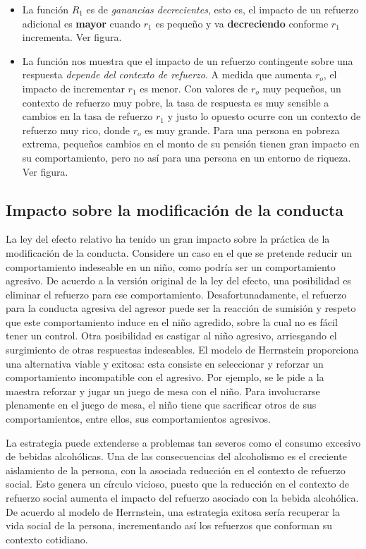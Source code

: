 \documentclass[
  letterpaper,
]{book}
\begin{document}
\begin{itemize}
\item
  La función \(R_1\) es de \emph{ganancias decrecientes}, esto es, el
  impacto de un refuerzo adicional es \textbf{mayor} cuando \(r_1\) es
  pequeño y va \textbf{decreciendo} conforme \(r_1\) incrementa. Ver
  figura.
\item
  La función nos muestra que el impacto de un refuerzo contingente sobre
  una respuesta \emph{depende del contexto de refuerzo}. A medida que
  aumenta \(r_o\), el impacto de incrementar \(r_1\) es menor. Con
  valores de \(r_o\) muy pequeños, un contexto de refuerzo muy pobre, la
  tasa de respuesta es muy sensible a cambios en la tasa de refuerzo
  \(r_1\) y justo lo opuesto ocurre con un contexto de refuerzo muy
  rico, donde \(r_o\) es muy grande. Para una persona en pobreza
  extrema, pequeños cambios en el monto de su pensión tienen gran
  impacto en su comportamiento, pero no así para una persona en un
  entorno de riqueza. Ver figura.
\end{itemize}

\subsection{Impacto sobre la modificación de la
conducta}\label{impacto-sobre-la-modificaciuxf3n-de-la-conducta}

La ley del efecto relativo ha tenido un gran impacto sobre la práctica
de la modificación de la conducta. Considere un caso en el que se
pretende reducir un comportamiento indeseable en un niño, como podría
ser un comportamiento agresivo. De acuerdo a la versión original de la
ley del efecto, una posibilidad es eliminar el refuerzo para ese
comportamiento. Desafortunadamente, el refuerzo para la conducta
agresiva del agresor puede ser la reacción de sumisión y respeto que
este comportamiento induce en el niño agredido, sobre la cual no es
fácil tener un control. Otra posibilidad es castigar al niño agresivo,
arriesgando el surgimiento de otras respuestas indeseables. El modelo de
Herrnstein proporciona una alternativa viable y exitosa: esta consiste
en seleccionar y reforzar un comportamiento incompatible con el
agresivo. Por ejemplo, se le pide a la maestra reforzar y jugar un juego
de mesa con el niño. Para involucrarse plenamente en el juego de mesa,
el niño tiene que sacrificar otros de sus comportamientos, entre ellos,
sus comportamientos agresivos.

La estrategia puede extenderse a problemas tan severos como el consumo
excesivo de bebidas alcohólicas. Una de las consecuencias del
alcoholismo es el creciente aislamiento de la persona, con la asociada
reducción en el contexto de refuerzo social. Esto genera un círculo
vicioso, puesto que la reducción en el contexto de refuerzo social
aumenta el impacto del refuerzo asociado con la bebida alcohólica. De
acuerdo al modelo de Herrnstein, una estrategia exitosa sería recuperar
la vida social de la persona, incrementando así los refuerzos que
conforman su contexto cotidiano.
\end{document}
